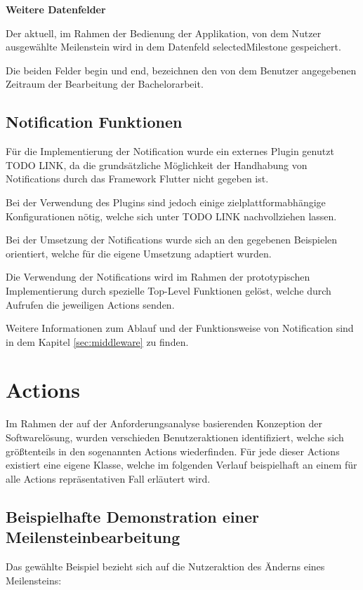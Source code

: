 \documentclass[bibliography=totoc,listof=totoc,BCOR=5mm,DIV=12,oneside]{scrbook}
\begin{document}
\par \bigskip \textbf{Weitere Datenfelder}
\par Der aktuell, im Rahmen der Bedienung der Applikation, von dem Nutzer ausgewählte Meilenstein wird in dem Datenfeld selectedMilestone gespeichert. 
\par \medskip Die beiden Felder begin und end, bezeichnen den von dem Benutzer angegebenen Zeitraum der Bearbeitung der Bachelorarbeit.

\newpage
\subsection{Notification Funktionen}
\par Für die Implementierung der Notification wurde ein externes Plugin genutzt TODO LINK, da die grundsätzliche Möglichkeit der Handhabung von Notifications durch das Framework Flutter nicht gegeben ist.
\par\medskip Bei der Verwendung des Plugins sind jedoch einige zielplattformabhängige Konfigurationen nötig, welche sich unter TODO LINK nachvollziehen lassen.
\par \medskip Bei der Umsetzung der Notifications wurde sich an den gegebenen Beispielen orientiert, welche für die eigene Umsetzung adaptiert wurden.
\par Die Verwendung der Notifications wird im Rahmen der prototypischen Implementierung durch spezielle Top-Level Funktionen gelöst, welche durch Aufrufen die jeweiligen Actions senden.
\par \bigskip Weitere Informationen zum Ablauf und der Funktionsweise von Notification sind in dem Kapitel \ref{sec:middleware} zu finden.

\newpage
\section{Actions}
\par Im Rahmen der auf der Anforderungsanalyse basierenden Konzeption der Softwarelösung, wurden verschieden Benutzeraktionen identifiziert, welche sich größtenteils in den sogenannten Actions wiederfinden.
Für jede dieser Actions existiert eine eigene Klasse, welche im folgenden Verlauf beispielhaft an einem für alle Actions repräsentativen Fall erläutert wird.

\subsection{Beispielhafte Demonstration einer Meilensteinbearbeitung}
\par Das gewählte Beispiel bezieht sich auf die Nutzeraktion des Änderns eines Meilensteins:
\end{document}
